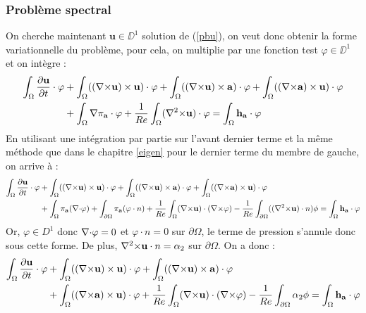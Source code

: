 \subsubsection{Problème spectral}
\label{spectre}

On cherche maintenant $\mathbf{u}\in\DD^1$ solution de (\ref{pbu}), on veut donc obtenir la forme variationnelle du problème, pour cela, on multiplie par une fonction test $\varphi\in\DD^1$ et on intègre :
\begin{align*}
\int_\Omega \frac{\partial \mathbf{u}}{\partial t}\cdot \varphi &+ \int_\Omega (({\nabla\times} \mathbf{u})\times \mathbf{u})\cdot \varphi + \int_\Omega (({\nabla\times} \mathbf{u})\times \mathbf{a})\cdot\varphi + \int_\Omega (({\nabla\times} \mathbf{a})\times \mathbf{u})\cdot\varphi \\
&+ \int_\Omega {\nabla}\pi_{\mathbf{a}}\cdot\varphi + \frac{1}{Re}\int_\Omega ({\nabla^2\times} \mathbf{u})\cdot\varphi = \int_\Omega \mathbf{h_a}\cdot\varphi
\end{align*}
En utilisant une intégration par partie sur l'avant dernier terme et la même méthode que dans le chapitre \ref{eigen} pour le dernier terme du membre de gauche, on arrive à :
\begin{align*}
\int_\Omega \frac{\partial \mathbf{u}}{\partial t}\cdot \varphi &+ \int_\Omega (({\nabla\times} \mathbf{u})\times \mathbf{u})\cdot \varphi + \int_\Omega (({\nabla\times} \mathbf{u})\times \mathbf{a})\cdot\varphi + \int_\Omega (({\nabla\times} \mathbf{a})\times \mathbf{u})\cdot\varphi\\
&+ \int_\Omega \pi_{\mathbf{a}}({\nabla\cdot}\varphi) + \int_{\partial \Omega} \pi_{\mathbf{a}}(\varphi\cdot n) + \frac{1}{Re}\int_\Omega ({\nabla\times} \mathbf{u})\cdot({\nabla\times}\varphi) -\frac{1}{Re}\int_{\partial\Omega} (({\nabla^2\times} \mathbf{u})\cdot n)\phi = \int_\Omega \mathbf{h_a}\cdot\varphi
\end{align*}
Or, $\varphi\in D^1$ donc ${\nabla\cdot}\varphi=0$ et $\varphi\cdot n=0$ sur $\partial\Omega$, le terme de pression s'annule donc sous cette forme. De plus, ${\nabla^2\times} \mathbf{u}\cdot n=\alpha_2$ sur $\partial\Omega$. On a donc :
\begin{align}
\label{fvu}
\int_\Omega \frac{\partial \mathbf{u}}{\partial t}\cdot \varphi &+ \int_\Omega (({\nabla\times} \mathbf{u})\times \mathbf{u})\cdot \varphi + \int_\Omega (({\nabla\times} \mathbf{u})\times \mathbf{a})\cdot\varphi \\
&+ \int_\Omega (({\nabla\times} \mathbf{a})\times \mathbf{u})\cdot\varphi + \frac{1}{Re}\int_\Omega ({\nabla\times} \mathbf{u})\cdot({\nabla\times}\varphi) -\frac{1}{Re}\int_{\partial\Omega} \alpha_2\phi = \int_\Omega \mathbf{h_a}\cdot\varphi
\end{align}

